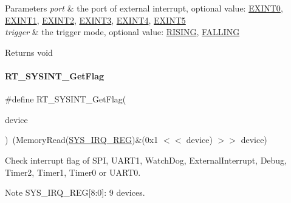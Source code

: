 \begin{DoxyParams}{Parameters}
{\em port} & the port of external interrupt, optional value\+: \mbox{\hyperlink{a00011_a2e3f727d359d26314631842394f4a223}{E\+X\+I\+N\+T0}}, \mbox{\hyperlink{a00011_a1ea7d6796165b98f1bc6bf6fe841c3d9}{E\+X\+I\+N\+T1}}, \mbox{\hyperlink{a00011_ac959f4d8aed4e04e25c966e6c8315431}{E\+X\+I\+N\+T2}}, \mbox{\hyperlink{a00011_ae8428c0cbd7362b90ea048bcf59aef2c}{E\+X\+I\+N\+T3}}, \mbox{\hyperlink{a00011_a719b5fa27b5469e1fe2844e9930fa249}{E\+X\+I\+N\+T4}}, \mbox{\hyperlink{a00011_a309fb21107f9f6261cd7e7ca9de6c2f2}{E\+X\+I\+N\+T5}} \\
\hline
{\em trigger} & the trigger mode, optional value\+: \mbox{\hyperlink{a00011_aeea2b49478f3b13faedba764985c6e96}{R\+I\+S\+I\+NG}}, \mbox{\hyperlink{a00011_ac00eb6fc2047dc399280f31b0c5f4472}{F\+A\+L\+L\+I\+NG}} \\
\hline
\end{DoxyParams}
\begin{DoxyReturn}{Returns}
void 
\end{DoxyReturn}
\mbox{\label{a00011_a397366295a7d6d3ed47e5e3d69549448}} 
\paragraph{\texorpdfstring{R\+T\+\_\+\+S\+Y\+S\+I\+N\+T\+\_\+\+Get\+Flag}{RT\_SYSINT\_GetFlag}}
{\footnotesize\ttfamily \#define R\+T\+\_\+\+S\+Y\+S\+I\+N\+T\+\_\+\+Get\+Flag(\begin{DoxyParamCaption}\item[{}]{device }\end{DoxyParamCaption})~(Memory\+Read(\mbox{\hyperlink{a00020_ae3e6052bd0e6d9801c5380f2d8d94a17}{S\+Y\+S\+\_\+\+I\+R\+Q\+\_\+\+R\+EG}})\&(0x1 $<$$<$ device) $>$$>$ device)}



Check interrupt flag of S\+PI, U\+A\+R\+T1, Watch\+Dog, External\+Interrupt, Debug, Timer2, Timer1, Timer0 or U\+A\+R\+T0. 

\begin{DoxyNote}{Note}
S\+Y\+S\+\_\+\+I\+R\+Q\+\_\+\+R\+EG\mbox{[}8\+:0\mbox{]}\+: 9 devices. 
\end{DoxyNote}

